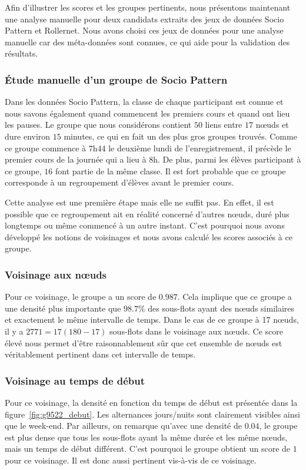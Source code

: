 
\bigskip

Afin d'illustrer les scores et les groupes pertinents, nous présentons maintenant une analyse manuelle pour deux candidats extraits des jeux de données Socio Pattern et Rollernet.
Nous avons choisi ces jeux de données pour une analyse manuelle car des méta-données sont connues, ce qui aide pour la validation des résultats.

\subsubsection{Étude manuelle d'un groupe de Socio Pattern}
Dans les données Socio Pattern, la classe de chaque participant est connue et nous savons également quand commencent les premiers cours et quand ont lieu les pauses.
Le groupe que nous considérons contient $50$ liens entre $17$ n\oe{}uds et dure environ $15$ minutes, ce qui en fait un des plus gros groupes trouvés.
Comme ce groupe commence à 7h44 le deuxième lundi de l'enregistrement, il précède le premier cours de la journée qui a lieu à 8h.
De plus, parmi les élèves participant à ce groupe, $16$ font partie de la même classe.
Il est fort probable que ce groupe corresponde à un regroupement d'élèves avant le premier cours.

Cette analyse est une première étape mais elle ne suffit pas.
En effet, il est possible que ce regroupement ait en réalité concerné d'autres n\oe{}uds, duré plus longtemps ou même commencé à un autre instant.
C'est pourquoi nous avons développé les notions de voisinages et nous avons calculé les scores associés à ce groupe.

\subsubsection*{Voisinage aux n\oe{}uds}
Pour ce voisinage, le groupe a un score de $0.987$.
Cela implique que ce groupe a une densité plus importante que $98.7\%$ des sous-flots ayant des n\oe{}uds similaires et exactement le même intervalle de temps.
Dans le cas de ce groupe à 17 n\oe{}uds, il y a $2771=17(180-17)$ sous-flots dans le voisinage aux n\oe{}uds.
Ce score élevé nous permet d'être raisonnablement sûr que cet ensemble de n\oe{}uds est véritablement pertinent dans cet intervalle de temps.

\subsubsection*{Voisinage au temps de début}
Pour ce voisinage, la densité en fonction du temps de début est présentée dans la figure~\ref{fig:g9522_debut}.
Les alternances jours/nuits sont clairement visibles ainsi que le week-end.
Par ailleurs, on remarque qu'avec une densité de $0.04$, le groupe est plus dense que tous les sous-flots ayant la même durée et les même n\oe{}uds, mais un temps de début différent.
C'est pourquoi le groupe obtient un score de $1$ pour ce voisinage.
Il est donc aussi pertinent vis-à-vis de ce voisinage.

